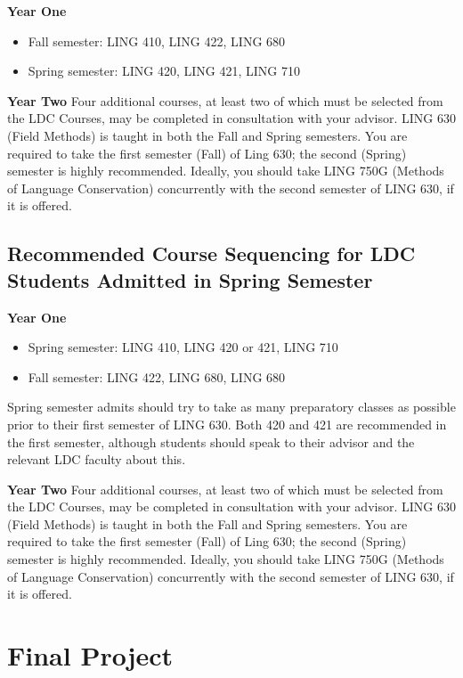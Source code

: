 \documentclass[
]{book}
\providecommand{\tightlist}{%
  \setlength{\itemsep}{0pt}\setlength{\parskip}{0pt}}
\begin{document}
\textbf{Year One}

\begin{itemize}
\tightlist
\item
  Fall semester: LING 410, LING 422, LING 680
\item
  Spring semester: LING 420, LING 421, LING 710
\end{itemize}

\textbf{Year Two}
Four additional courses, at least two of which must be selected from the LDC Courses, may be completed in consultation with your advisor. LING 630 (Field Methods) is taught in both the Fall and Spring semesters. You are required to take the first semester (Fall) of Ling 630; the second (Spring) semester is highly recommended. Ideally, you should take LING 750G (Methods of Language Conservation) concurrently with the second semester of LING 630, if it is offered.

\subsection{Recommended Course Sequencing for LDC Students Admitted in Spring Semester}\label{recommended-course-sequencing-for-ldc-students-admitted-in-spring-semester}

\textbf{Year One}

\begin{itemize}
\tightlist
\item
  Spring semester: LING 410, LING 420 or 421, LING 710
\item
  Fall semester: LING 422, LING 680, LING 680
\end{itemize}

Spring semester admits should try to take as many preparatory classes as possible prior to their first semester of LING 630. Both 420 and 421 are recommended in the first semester, although students should speak to their advisor and the relevant LDC faculty about this.

\textbf{Year Two}
Four additional courses, at least two of which must be selected from the LDC Courses, may be completed in consultation with your advisor. LING 630 (Field Methods) is taught in both the Fall and Spring semesters. You are required to take the first semester (Fall) of Ling 630; the second (Spring) semester is highly recommended. Ideally, you should take LING 750G (Methods of Language Conservation) concurrently with the second semester of LING 630, if it is offered.

\section{Final Project}\label{final-project}
\end{document}
